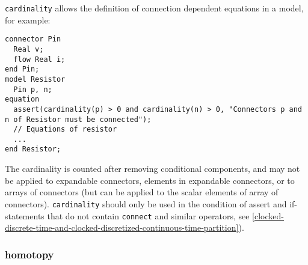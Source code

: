 \begin{nonnormative}
\lstinline!cardinality! allows the definition of connection dependent equations in a model, for example:
\begin{lstlisting}[language=modelica]
connector Pin
  Real v;
  flow Real i;
end Pin;
model Resistor
  Pin p, n;
equation
  assert(cardinality(p) > 0 and cardinality(n) > 0, "Connectors p and n of Resistor must be connected");
  // Equations of resistor
  ...
end Resistor;
\end{lstlisting}
\end{nonnormative}

The cardinality is counted after removing conditional components, and may not be applied to expandable connectors, elements in expandable connectors, or to arrays of connectors (but can be applied to
the scalar elements of array of connectors).  \lstinline!cardinality! should only be used in the condition of assert and if-statements that do not contain \lstinline!connect! and similar operators,
see \cref{clocked-discrete-time-and-clocked-discretized-continuous-time-partition}).

\subsubsection{homotopy}\label{homotopy}

